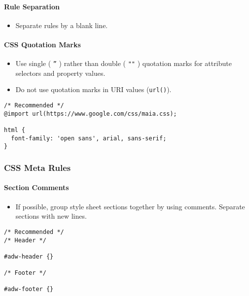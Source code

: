 \documentclass[a4paper, 11pt]{article}
\begin{document}
\paragraph{Rule Separation}
\begin{itemize}
\item Separate rules by a blank line.
\end{itemize}

\paragraph{CSS Quotation Marks}
\begin{itemize}
\item Use single ( \texttt{''} ) rather than double ( \texttt{""} ) quotation marks for attribute selectors and property values.
\item Do not use quotation marks in URI values (\texttt{url()}).
\end{itemize}
\begin{verbatim}
/* Recommended */
@import url(https://www.google.com/css/maia.css);

html {
  font-family: 'open sans', arial, sans-serif;
}
\end{verbatim}

\subsubsection{CSS Meta Rules}

\paragraph{Section Comments}
\begin{itemize}
\item If possible, group style sheet sections together by using comments. Separate sections with new lines.
\end{itemize}
\begin{verbatim}
/* Recommended */
/* Header */

#adw-header {}

/* Footer */

#adw-footer {}
\end{verbatim}

\pagebreak

\end{document}
